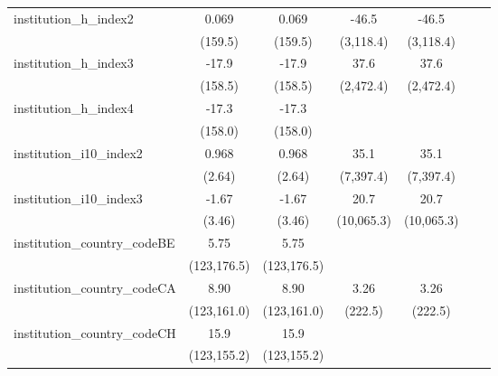 \begin{tabular}{lcccccc}
   institution\_h\_index2                & 0.069        & 0.069        & -46.5        & -46.5        &             &   \\   
                                         & (159.5)      & (159.5)      & (3,118.4)    & (3,118.4)    &             &   \\   
   institution\_h\_index3                & -17.9        & -17.9        & 37.6         & 37.6         &             &   \\   
                                         & (158.5)      & (158.5)      & (2,472.4)    & (2,472.4)    &             &   \\   
   institution\_h\_index4                & -17.3        & -17.3        &              &              &             &   \\   
                                         & (158.0)      & (158.0)      &              &              &             &   \\   
   institution\_i10\_index2              & 0.968        & 0.968        & 35.1         & 35.1         &             &   \\   
                                         & (2.64)       & (2.64)       & (7,397.4)    & (7,397.4)    &             &   \\   
   institution\_i10\_index3              & -1.67        & -1.67        & 20.7         & 20.7         &             &   \\   
                                         & (3.46)       & (3.46)       & (10,065.3)   & (10,065.3)   &             &   \\   
   institution\_country\_codeBE          & 5.75         & 5.75         &              &              &             &   \\   
                                         & (123,176.5)  & (123,176.5)  &              &              &             &   \\   
   institution\_country\_codeCA          & 8.90         & 8.90         & 3.26         & 3.26         &             &   \\   
                                         & (123,161.0)  & (123,161.0)  & (222.5)      & (222.5)      &             &   \\   
   institution\_country\_codeCH          & 15.9         & 15.9         &              &              &             &   \\   
                                         & (123,155.2)  & (123,155.2)  &              &              &             &   \\   

\end{tabular}
